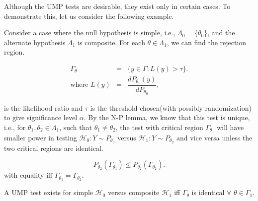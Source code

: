 \documentclass[a4paper,english,12pt]{article}
\begin{document}
Although the UMP tests are desirable, they exist only in certain cases. To demonstrate this, let us consider the following example.
\begin{exmp} 
Consider a case where the null hypothesis is simple, i.e., $\Lambda_0 = \{\theta_0\}$, and the alternate hypothesis $\Lambda_1$ is composite. For each $\theta \in \Lambda_1$, we can find the rejection region.

\begin{eqnarray}
\Gamma_\theta &=& \{y \in \Gamma: L(y) > \tau\}.\\
\text{where  } L(y) &=& \dfrac{dP_{\theta_1}(y)}{dP_{\theta_0}},	
\end{eqnarray}	

is the likelihood ratio and $\tau$ is the threshold chosen(with possibly randomization) to give significance level $\alpha$. By the N-P lemma, we know that this test is unique, i.e., for $\theta_1, \theta_2 \in \Lambda_1$, such that $\theta_1 \neq \theta_2 $, the test with critical region $\Gamma_{\theta_1}$ will have smaller power in testing $\mathcal{H}_0: Y \sim P_{\theta_0}$ versus $\mathcal{H}_1: Y \sim P_{\theta_2}$ and vice versa unless the two critical regions are identical.

\begin{equation*}
P_{\theta_{2}}(\Gamma_{\theta_1}) \leq P_{\theta_{2}}(\Gamma_{\theta_2}).
\end{equation*}
with equality iff $\Gamma_{\theta_1} = \Gamma_{\theta_2}$.

\begin{cor}
{A UMP test exists for simple $\mathcal{H}_0$ versus composite $\mathcal{H}_1$ iff $\Gamma_\theta$ is identical $\forall$ $\theta \in \Gamma_1$.}	
\end{cor}
\end{exmp}	
\end{document}
